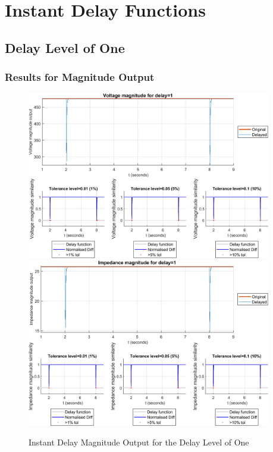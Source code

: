 \section{Instant Delay Functions}
\subsection{Delay Level of One}
\subsubsection{Results for Magnitude Output}
\begin{figure}
    \caption{Instant Delay Magnitude Output for the Delay Level of One}
    \includegraphics[width=0.95\textwidth]{PMUsim-figures/DelayOf_1/Instant_vMagnitude.png}    
      \includegraphics[width=0.95\textwidth]{PMUsim-figures/DelayOf_1/Instant_iMagnitude.png}      
    \label{fig:PMUsim_One_Magnitude}
    \begin{small}
     \end{small}
\end{figure}
